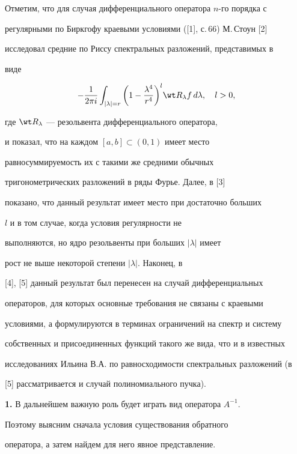 Отметим, что для случая дифференциального оператора $n$-го порядка с


регулярными по Биркгофу краевыми условиями ([1], с.\,66) М.\,Стоун [2]


исследовал средние по Риссу спектральных разложений, представимых в


виде


$$


-\frac1{2\pi i}\int_{|\lambda|=r}


\bigg(1-\frac{\lambda^4}{r^4}\bigg)^l\wt R_\lambda f\,d\lambda,


\quad l>0,


$$


где $\wt R_\lambda$ --- резольвента дифференциального оператора,


и показал, что на каждом $[a,b]\subset(0,1)$ имеет место


равносуммируемость их с такими же средними обычных


тригонометрических разложений в ряды Фурье. Далее, в [3]


показано, что данный результат имеет место при достаточно больших


$l$ и в том случае, когда условия регулярности не


выполняются, но ядро резольвенты при больших $|\lambda|$ имеет


рост не выше некоторой степени $|\lambda|$. Наконец, в


[4], [5] данный результат был перенесен на случай дифференциальных


операторов, для которых основные требования не связаны с краевыми


условиями, а формулируются в терминах ограничений на спектр и систему


собственных и присоединенных функций такого же вида, что и в известных


исследованиях Ильина В.А. по равносходимости спектральных разложений (в


[5] рассматривается и случай полиномиального пучка).


\medskip





{\bf 1.} В дальнейшем важную роль будет играть вид оператора $A^{-1}$.


Поэтому выясним  сначала условия существования обратного


оператора, а затем найдем для него явное представление.



